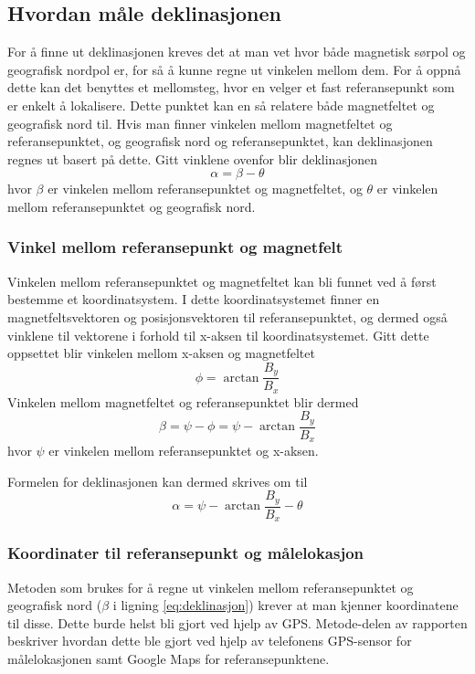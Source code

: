 \subsection{Hvordan måle deklinasjonen}
For å finne ut deklinasjonen kreves det at man vet hvor både magnetisk sørpol og 
geografisk nordpol er, for så å kunne regne ut vinkelen mellom dem. For å oppnå dette 
kan det benyttes et mellomsteg, hvor en velger et fast referansepunkt som er enkelt å lokalisere. Dette punktet kan 
en så relatere både magnetfeltet og geografisk nord til. 
Hvis man finner vinkelen mellom magnetfeltet 
og referansepunktet, og geografisk nord og referansepunktet, kan deklinasjonen 
regnes ut basert på dette. Gitt vinklene ovenfor blir deklinasjonen
\begin{equation}
    \alpha = \beta - \theta
\end{equation}
hvor $\beta$ er vinkelen mellom referansepunktet og magnetfeltet, og $\theta$ er 
vinkelen mellom referansepunktet og geografisk nord.

\subsubsection{Vinkel mellom referansepunkt og magnetfelt}
Vinkelen mellom referansepunktet og magnetfeltet kan bli funnet ved å først bestemme et koordinatsystem. I dette 
koordinatsystemet finner en magnetfeltsvektoren og posisjonsvektoren til referansepunktet, og dermed også vinklene 
til vektorene i forhold til x-aksen til koordinatsystemet. Gitt dette oppsettet blir vinkelen mellom x-aksen og 
magnetfeltet 
\begin{equation}
    \phi = \arctan \frac{B_y}{B_x}
\end{equation}
Vinkelen mellom magnetfeltet og referansepunktet blir dermed
\begin{equation}
    \beta = \psi - \phi = \psi - \arctan \frac{B_y}{B_x}
\end{equation}
hvor $\psi$ er vinkelen mellom referansepunktet og x-aksen.

Formelen for deklinasjonen kan dermed skrives om til
\begin{equation}
    \alpha = \psi - \arctan \frac{B_y}{B_x} - \theta
\end{equation}

\subsubsection{Koordinater til referansepunkt og målelokasjon}
Metoden som brukes for å regne ut vinkelen mellom referansepunktet og geografisk nord ($\beta$ i ligning \eqref{eq:deklinasjon}) krever at man kjenner koordinatene til disse. Dette burde helst bli gjort ved hjelp av GPS. Metode-delen av rapporten beskriver hvordan dette ble gjort ved hjelp av telefonens GPS-sensor for målelokasjonen samt Google Maps for referansepunktene.

